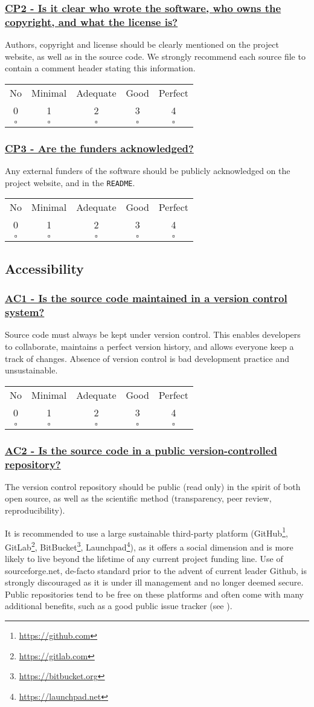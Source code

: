 \documentclass[a4paper,11pt]{article}
\newcommand{\criterion}[2]{\subsubsection*{\underline{#1 - #2}}\label{id:#1}}
\newcommand\CheckTable{%
  \begin{tabular}{ccccc}
    No & Minimal & Adequate & Good & Perfect \\
    0 & 1 & 2 & 3 & 4 \\
    \hline
    $\square$ & $\square$ & $\square$ & $\square$ & $\square$ \\
  \end{tabular}%
}
\newcommand{\refcrit}[1]{%
 \framebox[1.1\width]{\hyperref[id:#1]{#1}}
}
\begin{document}
\newcommand{\cpTwoID}{CP2}
\newcommand{\cpTwoText}{Is it clear who wrote the software, who owns the copyright, and what the license is?}
\criterion{\cpTwoID}{\cpTwoText}

Authors, copyright and license should be clearly mentioned on the project
website, as well as in the source code.  We strongly recommend each source file to contain a comment header stating this information.

\CheckTable

\newcommand{\cpThreeID}{CP3}
\newcommand{\cpThreeText}{Are the funders acknowledged?}
\criterion{\cpThreeID}{\cpThreeText}

Any external funders of the software should be publicly acknowledged on the project
website, and in the \texttt{README}.

\CheckTable

\subsection{Accessibility}\label{sec:acc}

\newcommand{\acOneID}{AC1}
\newcommand{\acOneText}{Is the source code maintained in a version control system?}
\criterion{\acOneID}{\acOneText}

Source code must always be kept under version control. This enables developers
to collaborate, maintains a perfect version history, and allows everyone keep a
track of changes. Absence of version control is bad development practice and
unsustainable.

\CheckTable

\newcommand{\acTwoID}{AC2}
\newcommand{\acTwoText}{Is the source code in a public version-controlled repository?}
\criterion{\acTwoID}{\acTwoText}

The version control repository should be public (read only) in the spirit of both open
source, as well as the scientific method (transparency, peer review,
reproducibility). 

It is recommended to use a large sustainable third-party platform
(GitHub\footnote{\url{https://github.com}},
GitLab\footnote{\url{https://gitlab.com}},
BitBucket\footnote{\url{https://bitbucket.org}},
Launchpad\footnote{\url{https://launchpad.net}}), as it offers a social
dimension and is more likely to live beyond the lifetime of any current project
funding line. Use of sourceforge.net, de-facto standard prior to the advent of
current leader Github, is strongly discouraged as it is under ill management
and no longer deemed secure. Public repositories tend to be free on these platforms and
often come with many additional benefits, such as a good public issue tracker
(see \refcrit{SP2}).
\end{document}
